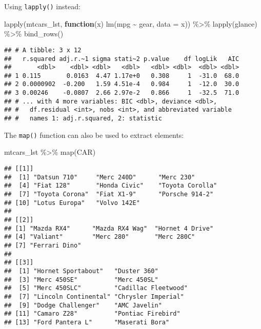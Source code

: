 \documentclass[
]{book}
\newenvironment{Shaded}{\begin{snugshade}}{\end{snugshade}}
\newcommand{\AttributeTok}[1]{\textcolor[rgb]{0.77,0.63,0.00}{#1}}
\newcommand{\ControlFlowTok}[1]{\textcolor[rgb]{0.13,0.29,0.53}{\textbf{#1}}}
\newcommand{\FunctionTok}[1]{\textcolor[rgb]{0.00,0.00,0.00}{#1}}
\newcommand{\NormalTok}[1]{#1}
\newcommand{\SpecialCharTok}[1]{\textcolor[rgb]{0.00,0.00,0.00}{#1}}
\newcommand{\StringTok}[1]{\textcolor[rgb]{0.31,0.60,0.02}{#1}}
\begin{document}
Using \texttt{lapply()} instead:

\begin{Shaded}
\begin{Highlighting}[]
\FunctionTok{lapply}\NormalTok{(mtcars\_lst, }\ControlFlowTok{function}\NormalTok{(x) }\FunctionTok{lm}\NormalTok{(mpg }\SpecialCharTok{\textasciitilde{}}\NormalTok{ gear, }\AttributeTok{data =}\NormalTok{ x)) }\SpecialCharTok{\%\textgreater{}\%}
  \FunctionTok{lapply}\NormalTok{(glance) }\SpecialCharTok{\%\textgreater{}\%} \FunctionTok{bind\_rows}\NormalTok{()}
\end{Highlighting}
\end{Shaded}

\begin{verbatim}
## # A tibble: 3 x 12
##   r.squared adj.r.~1 sigma stati~2 p.value    df logLik   AIC
##       <dbl>    <dbl> <dbl>   <dbl>   <dbl> <dbl>  <dbl> <dbl>
## 1 0.115       0.0163  4.47 1.17e+0   0.308     1  -31.0  68.0
## 2 0.0000902  -0.200   1.59 4.51e-4   0.984     1  -12.0  30.0
## 3 0.00246    -0.0807  2.66 2.97e-2   0.866     1  -32.5  71.0
## # ... with 4 more variables: BIC <dbl>, deviance <dbl>,
## #   df.residual <int>, nobs <int>, and abbreviated variable
## #   names 1: adj.r.squared, 2: statistic
\end{verbatim}

The \texttt{map()} function can also be used to extract elements:

\begin{Shaded}
\begin{Highlighting}[]
\NormalTok{mtcars\_lst }\SpecialCharTok{\%\textgreater{}\%} \FunctionTok{map}\NormalTok{(}\StringTok{\textquotesingle{}CAR\textquotesingle{}}\NormalTok{)}
\end{Highlighting}
\end{Shaded}

\begin{verbatim}
## [[1]]
##  [1] "Datsun 710"     "Merc 240D"      "Merc 230"      
##  [4] "Fiat 128"       "Honda Civic"    "Toyota Corolla"
##  [7] "Toyota Corona"  "Fiat X1-9"      "Porsche 914-2" 
## [10] "Lotus Europa"   "Volvo 142E"    
## 
## [[2]]
## [1] "Mazda RX4"      "Mazda RX4 Wag"  "Hornet 4 Drive"
## [4] "Valiant"        "Merc 280"       "Merc 280C"     
## [7] "Ferrari Dino"  
## 
## [[3]]
##  [1] "Hornet Sportabout"   "Duster 360"         
##  [3] "Merc 450SE"          "Merc 450SL"         
##  [5] "Merc 450SLC"         "Cadillac Fleetwood" 
##  [7] "Lincoln Continental" "Chrysler Imperial"  
##  [9] "Dodge Challenger"    "AMC Javelin"        
## [11] "Camaro Z28"          "Pontiac Firebird"   
## [13] "Ford Pantera L"      "Maserati Bora"
\end{verbatim}
\end{document}
